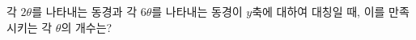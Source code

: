 각 $2\theta$를 나타내는 동경과 각 $6\theta$를 나타내는 동경이 $y$축에 대하여 대칭일 때, 이를 만족시키는 각 $\theta$의 개수는? \dmcondfill{$\pi<\theta<2\pi$}{}
